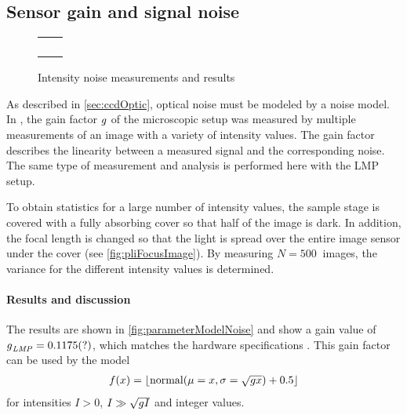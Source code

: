 \subsection{Sensor gain and signal noise}\label{sec:sensorGain}
%
\begin{figure}[!t]
\centering
%
\setlength{\tikzwidth}{0.3\textwidth}
\setlength{\tikzheight}{0.3\textwidth}
%
\setlength{\tabcolsep}{0em}
\begin{tabular}{C{0.5\textwidth}C{0.5\textwidth}}
&
\\[-1em]
%
 &
 \\[2em]
%
&
\\[-1em]
%
 &
\end{tabular}
%
\caption{Intensity noise measurements and results}
\label{fig:parameterModelGain}
\end{figure}
%
As described in \cref{sec:ccdOptic}, optical noise must be modeled by a noise model.
In \cite{Wiese:887678}, the gain factor $\textnormal{$g$}$ of the microscopic setup was measured by multiple measurements of an image with a variety of intensity values.
The gain factor describes the linearity between a measured signal and the corresponding noise.
The same type of measurement and analysis is performed here with the \ac{LMP} setup.
\par
To obtain statistics for a large number of intensity values, the sample stage is covered with a fully absorbing cover so that half of the image is dark.
In addition, the focal length is changed so that the light is spread over the entire image sensor under the cover (see \cref{fig:pliFocusImage}).
By measuring $N=\SI{500}{}$ images, the variance for the different intensity values is determined.
%
\paragraph{Results and discussion}
The results are shown in \cref{fig:parameterModelNoise} and show a gain value of $\textnormal{$g$}_{\mathit{LMP}} = \SI{0.1175}{}(?)$, which matches the hardware specifications .
This gain factor can be used by the model
\begin{align}
f(x) = \lfloor\mathrm{normal}(\mu = x, \sigma=\sqrt{\textnormal{$g$} x})+0.5\rfloor
\end{align}
for intensities $I > 0$, $I \gg \sqrt{\textnormal{$g$} I}$ and integer values.
%
%
%
